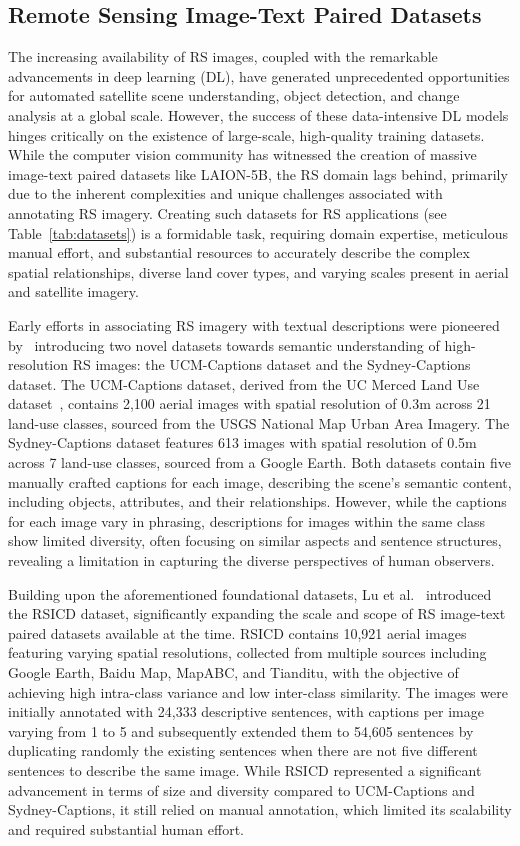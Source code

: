 \subsection{Remote Sensing Image-Text Paired Datasets}
The increasing availability of RS images, coupled with the remarkable advancements in deep learning (DL), have generated unprecedented opportunities for automated satellite scene understanding, object detection, and change analysis at a global scale. However, the success of these data-intensive DL models hinges critically on the existence of large-scale, high-quality training datasets. While the computer vision community has witnessed the creation of massive image-text paired datasets like LAION-5B, the RS domain lags behind, primarily due to the inherent complexities and unique challenges associated with annotating RS imagery. Creating such datasets for RS applications (see Table~\ref{tab:datasets}) is a formidable task, requiring domain expertise, meticulous manual effort, and substantial resources to accurately describe the complex spatial relationships, diverse land cover types, and varying scales present in aerial and satellite imagery.

Early efforts in associating RS imagery with textual descriptions were pioneered by~\cite{qu2016deep} introducing two novel datasets towards semantic understanding of high-resolution RS images: the UCM-Captions dataset and the Sydney-Captions dataset. The UCM-Captions dataset, derived from the UC Merced Land Use dataset~\cite{yang2010bag}, contains 2,100 aerial images with spatial resolution of 0.3m across 21 land-use classes, sourced from the USGS National Map Urban Area Imagery. The Sydney-Captions dataset features 613 images with spatial resolution of 0.5m across 7 land-use classes, sourced from a Google Earth. Both datasets contain five manually crafted captions for each image, describing the scene's semantic content, including objects, attributes, and their relationships. However, while the captions for each image vary in phrasing, descriptions for images within the same class show limited diversity, often focusing on similar aspects and sentence structures, revealing a limitation in capturing the diverse perspectives of human observers.

Building upon the aforementioned foundational datasets, Lu et al.~\cite{lu2017exploring} introduced the RSICD dataset, significantly expanding the scale and scope of RS image-text paired datasets available at the time. RSICD contains 10,921 aerial images featuring varying spatial resolutions, collected from multiple sources including Google Earth, Baidu Map, MapABC, and Tianditu, with the objective of achieving high intra-class variance and low inter-class similarity. The images were initially annotated with 24,333 descriptive sentences, with captions per image varying from 1 to 5 and subsequently extended them to 54,605 sentences by duplicating randomly the existing sentences when there are not five different sentences to describe the same image. While RSICD represented a significant advancement in terms of size and diversity compared to UCM-Captions and Sydney-Captions, it still relied on manual annotation, which limited its scalability and required substantial human effort.


